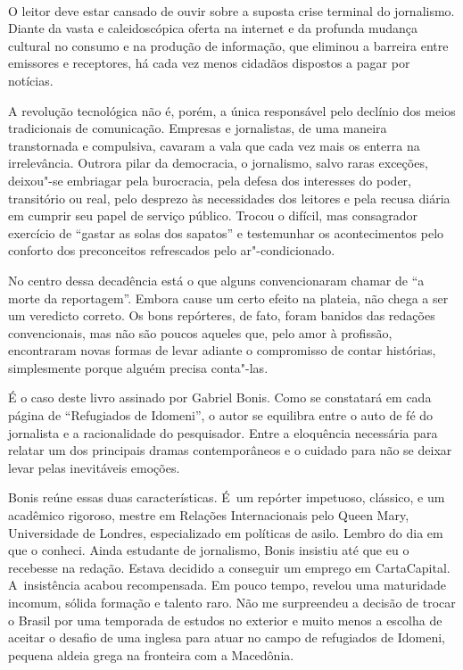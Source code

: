  

​

O leitor deve estar cansado de ouvir sobre a suposta crise terminal do
jornalismo. Diante da vasta e caleidoscópica oferta na internet e da
profunda mudança cultural no consumo e na produção de informação, que
eliminou a barreira entre emissores e receptores, há cada vez menos
cidadãos dispostos a pagar por notícias.

A revolução tecnológica não é, porém, a única responsável pelo declínio
dos meios tradicionais de comunicação. Empresas e jornalistas, de uma
maneira transtornada e compulsiva, cavaram a vala que cada vez mais os
enterra na irrelevância. Outrora pilar da democracia, o jornalismo,
salvo raras exceções, deixou"-se embriagar pela burocracia, pela defesa
dos interesses do poder, transitório ou real, pelo desprezo às
necessidades dos leitores e pela recusa diária em cumprir seu papel de
serviço público. Trocou o difícil, mas consagrador exercício de ``gastar
as solas dos sapatos'' e testemunhar os acontecimentos pelo conforto dos
preconceitos refrescados pelo ar"-condicionado.

No centro dessa decadência está o que alguns convencionaram chamar de
``a morte da reportagem''. Embora cause um certo efeito na plateia, não
chega a ser um veredicto correto. Os bons repórteres, de fato, foram
banidos das redações convencionais, mas não são poucos aqueles que, pelo
amor à profissão, encontraram novas formas de levar adiante o
compromisso de contar histórias, simplesmente porque alguém precisa
conta"-las.

É o caso deste livro assinado por Gabriel Bonis. Como se constatará em
cada página de ``Refugiados de Idomeni'', o autor se equilibra entre o
auto de fé do jornalista e a racionalidade do pesquisador. Entre a
eloquência necessária para relatar um dos principais dramas
contemporâneos e o cuidado para não se deixar levar pelas inevitáveis
emoções.

Bonis reúne essas duas características. É~um repórter impetuoso,
clássico, e um acadêmico rigoroso, mestre em Relações Internacionais
pelo Queen Mary, Universidade de Londres, especializado em políticas de
asilo. Lembro do dia em que o conheci. Ainda estudante de jornalismo,
Bonis insistiu até que eu o recebesse na redação. Estava decidido a
conseguir um emprego em CartaCapital. A~insistência acabou recompensada.
Em pouco tempo, revelou uma maturidade incomum, sólida formação e
talento raro. Não me surpreendeu a decisão de trocar o Brasil por uma
temporada de estudos no exterior e muito menos a escolha de aceitar o
desafio de uma  inglesa para atuar no campo de refugiados de Idomeni,
pequena aldeia grega na fronteira com a Macedônia.

